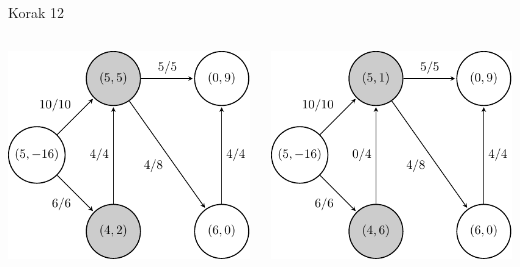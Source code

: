 \documentclass{beamer}
\begin{document}
\begin{frame}{Korak 12}
    \begin{columns}
        \begin{column}{0.5\textwidth}
            \centering
            \includegraphics[scale=0.7]{../writing/images/graf2-13.pdf}
        \end{column}
        \pause
        \begin{column}{0.5\textwidth}
            \centering
            \includegraphics[scale=0.7]{../writing/images/graf2-14.pdf}
        \end{column}
    \end{columns}
\end{frame}
\end{document}
